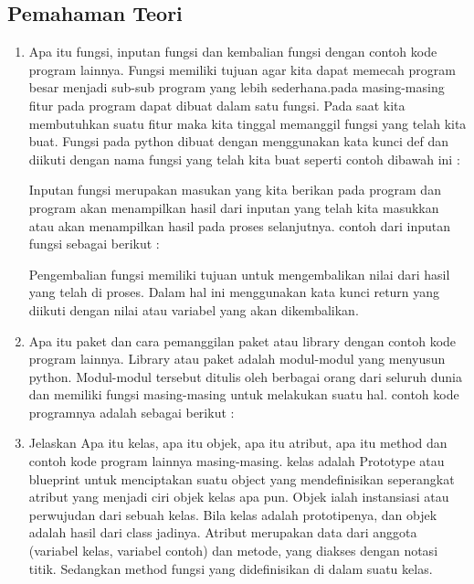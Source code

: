 \subsection{Pemahaman Teori}
\begin{enumerate}
    \item Apa itu fungsi, inputan fungsi dan kembalian fungsi dengan contoh kode program lainnya.
Fungsi memiliki tujuan agar kita dapat memecah program besar menjadi sub-sub program yang lebih sederhana.pada masing-masing  fitur pada program dapat dibuat dalam satu fungsi. Pada saat kita membutuhkan suatu fitur maka kita tinggal memanggil fungsi yang telah kita buat. Fungsi pada python dibuat dengan menggunakan kata kunci def dan diikuti dengan nama fungsi yang telah kita buat seperti contoh dibawah ini :
 
Inputan fungsi merupakan masukan yang kita berikan pada program dan program akan menampilkan hasil dari inputan yang telah kita masukkan atau akan menampilkan hasil pada proses selanjutnya. contoh dari inputan fungsi sebagai berikut :
 
Pengembalian fungsi memiliki tujuan untuk mengembalikan nilai dari hasil yang telah di proses. Dalam hal ini menggunakan kata kunci return yang diikuti dengan nilai atau variabel yang akan dikembalikan.
 

    \item Apa itu paket dan cara pemanggilan paket atau library dengan contoh kode program lainnya.
Library atau paket adalah modul-modul yang menyusun python. Modul-modul tersebut ditulis oleh berbagai orang dari seluruh dunia dan memiliki fungsi masing-masing untuk melakukan suatu hal. contoh kode programnya adalah sebagai berikut :
 

    \item Jelaskan Apa itu kelas, apa itu objek, apa itu atribut, apa itu method dan contoh kode program lainnya masing-masing.
kelas adalah Prototype atau blueprint untuk menciptakan suatu object  yang mendefinisikan seperangkat atribut yang menjadi ciri objek kelas apa pun. Objek ialah instansiasi atau perwujudan dari sebuah kelas. Bila kelas adalah prototipenya, dan objek adalah hasil dari class jadinya. Atribut merupakan data dari anggota (variabel kelas, variabel contoh) dan metode, yang diakses dengan notasi titik. Sedangkan method fungsi yang didefinisikan di dalam suatu kelas.
 


\end{enumerate}
